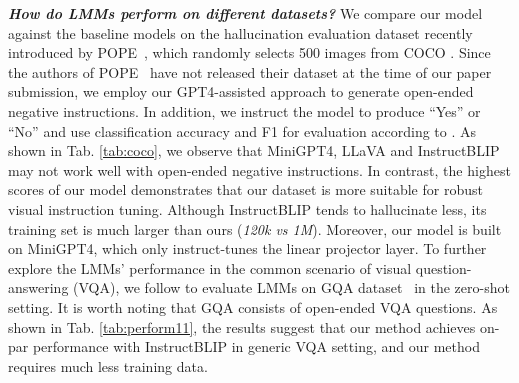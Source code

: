 \textbf{\textit{How do LMMs perform on different datasets? }}We compare our model against the baseline models on the hallucination evaluation dataset recently introduced by POPE~\cite{li2023evaluating}, which randomly selects 500 images from COCO \cite{lin2014microsoft}. Since the authors of POPE~\cite{li2023evaluating} have not released their dataset at the time of our paper submission, we employ our GPT4-assisted approach to generate open-ended negative instructions. In addition, we instruct the model to produce “Yes” or “No” and use classification accuracy and F1 for evaluation according to \cite{li2023evaluating}. As shown in Tab. \ref{tab:coco}, we observe that MiniGPT4, LLaVA and InstructBLIP may not work well with open-ended negative instructions. In contrast, the highest scores of our model demonstrates that our dataset is more suitable for robust visual instruction tuning. Although InstructBLIP tends to hallucinate less, its training set is much larger than ours (\textit{120k vs 1M}). Moreover, our model is built on MiniGPT4, which only instruct-tunes the linear projector layer. To further explore the LMMs' performance in the common scenario of visual question-answering (VQA), we follow \cite{li2023evaluating} to evaluate LMMs on GQA dataset~\cite{hudson2019gqa} in the zero-shot setting. It is worth noting that GQA consists of open-ended VQA questions. As shown in Tab. \ref{tab:perform11}, the results suggest that our method achieves on-par performance with InstructBLIP in generic VQA setting, and our method requires much less training data. %




